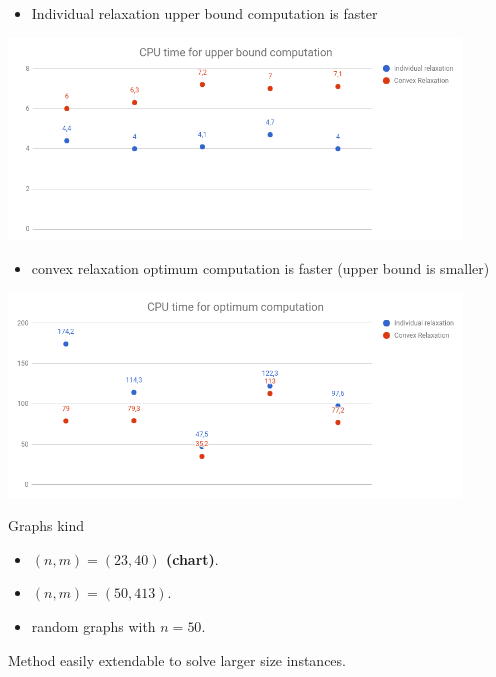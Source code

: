 \documentclass{beamer}
\begin{document}
\begin{frame}
\begin{itemize}
	\item Individual relaxation upper bound computation is faster
\end{itemize}
\hspace*{-0.8cm}
\includegraphics[width=12cm]{media/cpu_upper.png}
\end{frame}
	

\begin{frame}
\begin{itemize}
	\item convex relaxation optimum computation is faster (upper bound is smaller)
\end{itemize}
\hspace*{-0.8cm}
\includegraphics[width=12cm]{media/cpu_opt.png}
\end{frame}

\begin{frame}
	Graphs kind
	\begin{itemize}
		\item \textbf{$(n,m) = (23,40)$ (chart)}.
		\pause
		\item $(n,m) = (50,413)$.
		\pause
		\item random graphs with $n=50$.
	\end{itemize}
	\pause
	Method easily extendable to solve larger size instances.
\end{frame}
\end{document}
